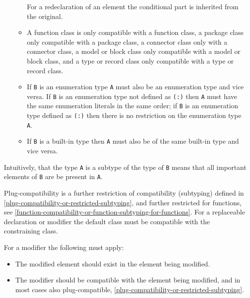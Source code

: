 \begin{itemize}
\begin{itemize}
    \begin{nonnormative}
    For a redeclaration of an element the conditional part is inherited from the original.
    \end{nonnormative}
  \item
    A function class is only compatible with a function class, a package
    class only compatible with a package class, a connector class only
    with a connector class, a model or block class only compatible with
    a model or block class, and a type or record class only compatible
    with a type or record class.
  \item
    If \lstinline!B! is an enumeration type \lstinline!A! must also be an enumeration type and
    vice versa. If \lstinline!B! is an enumeration type not defined as \lstinline!(:)! then \lstinline!A!
    must have the same enumeration literals in the same order; if \lstinline!B! is
    an enumeration type defined as \lstinline!(:)! then there is no restriction on
    the enumeration type \lstinline!A!.
  \item
    If \lstinline!B! is a built-in type then \lstinline!A! must also be of the same built-in
    type and vice versa.
  \end{itemize}
\end{itemize}

\begin{nonnormative}
Intuitively, that the type \lstinline!A! is a subtype of the type of \lstinline!B! means that all important elements of \lstinline!B! are be present in \lstinline!A!.
\end{nonnormative}

Plug-compatibility is a further restriction of compatibility (subtyping)
defined in \autoref{plug-compatibility-or-restricted-subtyping}, and further restricted for functions, see
\autoref{function-compatibility-or-function-subtyping-for-functions}. For a replaceable declaration or modifier the default class
must be compatible with the constraining class.

For a modifier the following must apply:
\begin{itemize}
\item
  The modified element should exist in the element being modified.
\item
  The modifier should be compatible with the element being modified, and
  in most cases also plug-compatible, \autoref{plug-compatibility-or-restricted-subtyping}.
\end{itemize}

